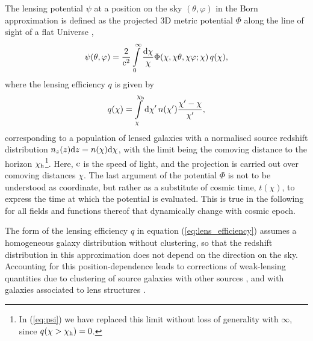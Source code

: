 \documentclass[fleqn,usenatbib]{mnras} %
\begin{document}
The lensing potential $\psi$ at a position on the sky $(\theta, \varphi)$ in
the Born approximation is defined as the projected 3D metric potential $\Phi$
along the line of sight of a flat Universe \citep{1998ApJ...498...26K,BS01},
%
%
\begin{equation}
  \psi(\theta, \varphi) = \frac 2 {{\rm c}^2} \int\limits_0^\infty \frac{{\rm d}\chi}{\chi}
    \Phi(\chi, \chi \theta, \chi \varphi; \chi) \, q(\chi),
  \label{eq:psi}
\end{equation}
%
where the lensing efficiency $q$ is given by
%
\begin{equation}
  q(\chi) = \int\limits_\chi^{\chi_{\rm h}} {\rm d} \chi^\prime \, n(\chi^\prime)
    \frac{\chi^\prime - \chi}{\chi^\prime},
  \label{eq:lens_efficiency}
\end{equation}
%
corresponding to a population of lensed galaxies with a normalised source
redshift distribution $n_z(z) {\rm d}z = n(\chi) {\rm d} \chi$, with the limit
being the comoving distance to the horizon $\chi_{\rm h}$\footnote{In
(\ref{eq:psi}) we have replaced this limit without loss of generality with
$\infty$, since $q(\chi > \chi_{\rm h}) = 0$.}. Here, ${\rm c}$ is the speed of
light, and the projection is carried out over comoving distances $\chi$.
The last argument of the potential $\Phi$ is not to
be understood as coordinate, but rather as a substitute of cosmic time,
$t(\chi)$, to express the time at which the potential is evaluated. This is
true in the following for all fields and functions thereof that dynamically
change with cosmic epoch.

The form of the lensing efficiency $q$ in equation (\ref{eq:lens_efficiency})
assumes a homogeneous galaxy distribution without clustering, so that the
redshift distribution in this approximation does not depend on the direction on
the sky. Accounting for this position-dependence leads to corrections of
weak-lensing quantities due to clustering of source galaxies with other sources
\citep{2002A&A...389..729S}, and with galaxies associated to lens structures
\citep{1998A&A...338..375B,H02}.
\end{document}
